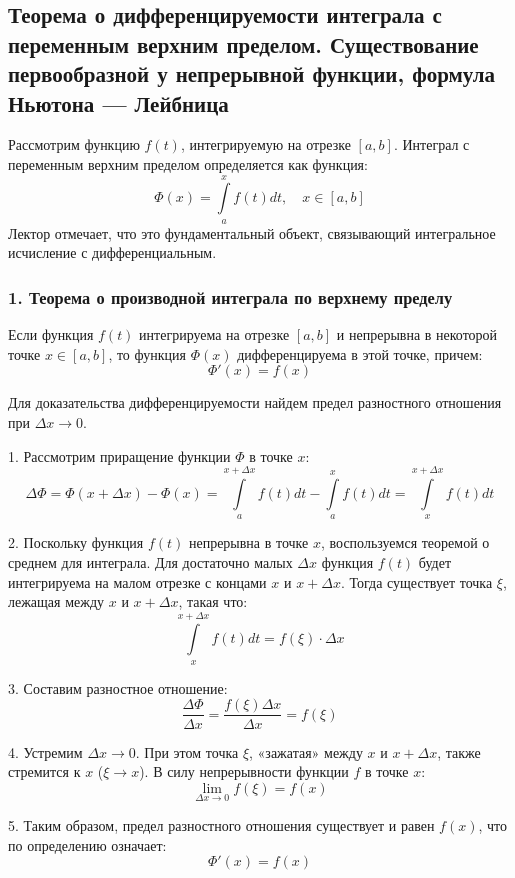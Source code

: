 \subsection{Теорема о дифференцируемости интеграла с переменным верхним пределом. Существование первообразной у непрерывной функции, формула Ньютона — Лейбница}

Рассмотрим функцию $f(t)$, интегрируемую на отрезке $[a, b]$. Интеграл с переменным верхним пределом определяется как функция:
\[ \Phi(x) = \int\limits_a^x f(t) dt, \quad x \in [a, b] \]
Лектор отмечает, что это фундаментальный объект, связывающий интегральное исчисление с дифференциальным.

\subsubsection*{1. Теорема о производной интеграла по верхнему пределу}

\begin{theorem}
Если функция $f(t)$ интегрируема на отрезке $[a, b]$ и непрерывна в некоторой точке $x \in [a, b]$, то функция $\Phi(x)$ дифференцируема в этой точке, причем:
\[ \Phi'(x) = f(x) \]
\end{theorem}

\begin{tcolorbox}[title=Доказательство, breakable]
Для доказательства дифференцируемости найдем предел разностного отношения при $\Delta x \to 0$.

1. Рассмотрим приращение функции $\Phi$ в точке $x$:
\[ \Delta \Phi = \Phi(x + \Delta x) - \Phi(x) = \int\limits_a^{x + \Delta x} f(t) dt - \int\limits_a^x f(t) dt = \int\limits_x^{x + \Delta x} f(t) dt \]

2. Поскольку функция $f(t)$ непрерывна в точке $x$, воспользуемся теоремой о среднем для интеграла. Для достаточно малых $\Delta x$ функция $f(t)$ будет интегрируема на малом отрезке с концами $x$ и $x + \Delta x$. Тогда существует точка $\xi$, лежащая между $x$ и $x + \Delta x$, такая что:
\[ \int\limits_x^{x + \Delta x} f(t) dt = f(\xi) \cdot \Delta x \]

3. Составим разностное отношение:
\[ \frac{\Delta \Phi}{\Delta x} = \frac{f(\xi) \Delta x}{\Delta x} = f(\xi) \]

4. Устремим $\Delta x \to 0$. При этом точка $\xi$, «зажатая» между $x$ и $x + \Delta x$, также стремится к $x$ ($\xi \to x$). В силу непрерывности функции $f$ в точке $x$:
\[ \lim_{\Delta x \to 0} f(\xi) = f(x) \]

5. Таким образом, предел разностного отношения существует и равен $f(x)$, что по определению означает:
\[ \Phi'(x) = f(x) \]
\end{tcolorbox}


